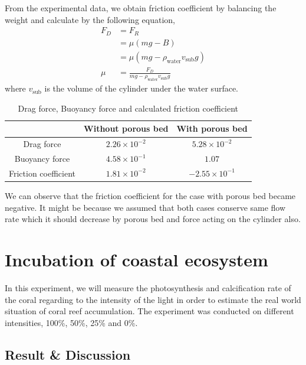 \documentclass[a4paper]{report}
\begin{document}
From the experimental data, we obtain friction coefficient by balancing the weight and calculate by the following equation,
\begin{align*}
    F_D &= F_R \\
    &= \mu(mg-B)\\
    &=\mu(mg-\rho_{\text{water}}v_{\text{sub}}g)\\
    \mu &=\frac{F_D}{mg-\rho_{\text{water}}v_{\text{sub}}g}
\end{align*}
where $v_{\text{sub}}$ is the volume of the cylinder under the water surface.

\begin{table}[H]
    \centering
    \begin{tabular}{|c|c|c|}\hline
        & Without porous bed & With porous bed \\\hline
        Drag force & $2.26\times10^{-2}$ & $5.28\times10^{-2}$ \\\hline
        Buoyancy force & $4.58\times10^{-1}$ & $1.07$ \\\hline
        Friction coefficient & $1.81\times10^{-2}$ & $-2.55\times10^{-1}$\\\hline
    \end{tabular}
    \caption{Drag force, Buoyancy force and calculated friction coefficient}
    \label{tb:drag-b-mu}
\end{table}

We can observe that the friction coefficient for the case with porous bed became negative. It might be because we assumed that both cases conserve same flow rate which it should decrease by porous bed and force acting on the cylinder also.


\chapter{Incubation of coastal ecosystem}
\label{sec:secondExperiment}

In this experiment, we will measure the photosynthesis and calcification rate of the coral regarding to
the intensity of the light in order to estimate the real world situation of coral reef accumulation. The experiment
was conducted on different intensities, 100\%, 50\%, 25\% and 0\%.

\section{Result \& Discussion}
\end{document}
